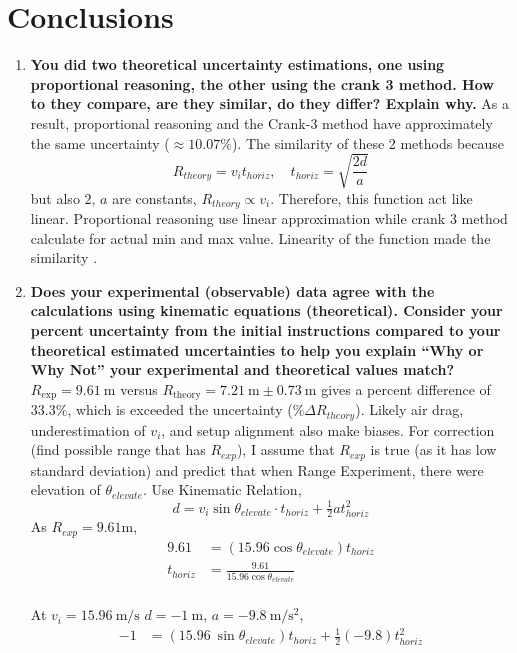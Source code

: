 \documentclass[12pt]{article}
\begin{document}
\section{Conclusions}
\begin{enumerate}[label=(\alph*), leftmargin=1.2cm]
  \item \textbf{You did two theoretical uncertainty estimations, one using proportional reasoning, the other using the crank 3 method. How to they compare, are they similar, do they differ? Explain why.} As a result, proportional reasoning and the Crank-3 method have approximately the same uncertainty ($\approx 10.07\%$). The similarity of these 2 methods because 
  \[
  R_{theory}=v_it_{horiz}, \quad t_{horiz}=\sqrt{\frac{2d}{a}}
  \]
  but also $2$, $a$ are constants,  $R_{theory} \propto v_i$. Therefore, this function act like linear. Proportional reasoning use linear approximation while crank 3 method calculate for actual min and max value. Linearity of the function made the similarity \cite{Taylor1997}.
  
  \item \textbf{Does your experimental (observable) data agree with the calculations using kinematic equations (theoretical). Consider your percent uncertainty from the initial instructions compared to your theoretical estimated uncertainties to help you explain “Why or Why Not” your experimental and theoretical values match?} $R_{\exp}=9.61~\mathrm{m}$ versus $R_{\mathrm{theory}}=7.21~\mathrm{m}\pm0.73~\mathrm{m}$ gives a percent difference of $33.3\%$, which is exceeded the uncertainty ($\%\Delta R_{theory}$). Likely air drag, underestimation of $v_i$, and setup alignment also make biases.
  For correction (find possible range that has $R_{exp}$), I assume that $R_{exp}$ is true (as it has low standard deviation) and predict that when Range Experiment, there were elevation of $\theta_{elevate}$.
    Use Kinematic Relation,
    \[
    d = v_i \sin \theta_{elevate} \cdot t_{horiz}+\tfrac12 at_{horiz}^2
    \]
    As $R_{exp}=9.61\mathrm{m}$,
    \[
    \begin{aligned}
    9.61 &= (15.96 \cos \theta_{elevate} )t_{horiz} \\
    t_{horiz} &= \frac{9.61}{15.96\cos\theta_{elevate}} \\
    \end{aligned}
    \]
    \vspace{1em}
    
    At $v_i=15.96~\mathrm{m/s}$ 
    $d=-1~\mathrm{m}$, $a=-9.8~\mathrm{m/s^2}$,
    \[
    \begin{aligned}
    -1 &= (15.96~\sin\theta_{elevate})t_{horiz} +\tfrac12(-9.8)t_{horiz}^2 \\
    \end{aligned}
    \]


\end{enumerate}
\end{document}
